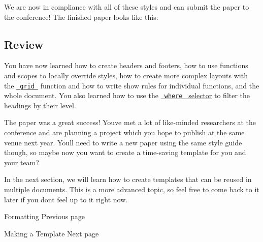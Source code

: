 We are now in compliance with all of these styles and can submit the
paper to the conference! The finished paper looks like this:


\subsection{Review}\label{review}

You have now learned how to create headers and footers, how to use
functions and scopes to locally override styles, how to create more
complex layouts with the
\href{/docs/reference/layout/grid/}{\texttt{\ grid\ }} function and how
to write show rules for individual functions, and the whole document.
You also learned how to use the
\href{/docs/reference/styling/\#show-rules}{\texttt{\ where\ } selector}
to filter the headings by their level.

The paper was a great success! You\textquotesingle ve met a lot of
like-minded researchers at the conference and are planning a project
which you hope to publish at the same venue next year.
You\textquotesingle ll need to write a new paper using the same style
guide though, so maybe now you want to create a time-saving template for
you and your team?

In the next section, we will learn how to create templates that can be
reused in multiple documents. This is a more advanced topic, so feel
free to come back to it later if you don\textquotesingle t feel up to it
right now.

\href{/docs/tutorial/formatting/}{\pandocbounded{}}

{ Formatting } { Previous page }

\href{/docs/tutorial/making-a-template/}{\pandocbounded{}}

{ Making a Template } { Next page }
